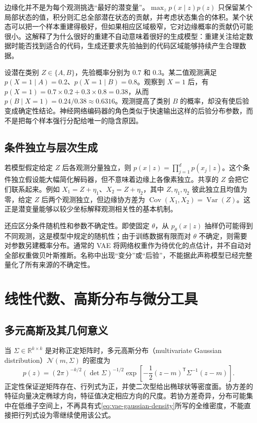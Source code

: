 \documentclass[UTF8,12pt,a4paper,fontset=fandol]{ctexart}
\begin{document}
边缘化并不是为每个观测挑选“最好的潜变量”。$\max_z p(x\mid z)p(z)$ 只保留某个局部状态的值，积分则汇总全部潜在状态的贡献，并考虑状态集合的体积。某个状态可以把一个样本重建得极好，但如果相应区域极窄，它对边缘概率的贡献仍可能很小。这解释了为什么很好的重建不自动意味着很好的生成模型：重建关注给定数据时能否找到适合的代码，生成还要求先验抽到的代码区域能够持续产生合理数据。

\begin{example}[离散后验的手算]
设潜在类别 $Z\in\{A,B\}$，先验概率分别为 $0.7$ 和 $0.3$。某二值观测满足 $p(X=1\mid A)=0.2$、$p(X=1\mid B)=0.8$。观察到 $X=1$ 后，有 $p(X=1)=0.7\times0.2+0.3\times0.8=0.38$，从而 $p(B\mid X=1)=0.24/0.38\approx0.6316$。观测提高了类别 $B$ 的概率，却没有使后验变成确定性结论。神经网络编码器的角色类似于快速输出这样的后验分布参数，而不是把每个样本强行分配给唯一的隐含原因。
\end{example}

\subsection{条件独立与层次生成}
若模型假定给定 $Z$ 后各观测分量独立，则 $p(x\mid z)=\prod_{j=1}^{d}p(x_j\mid z)$。这个条件独立假设能大幅简化解码器，但不意味着边缘上各像素独立。共享的 $Z$ 会把它们联系起来。例如 $X_1=Z+\eta_1$、$X_2=Z+\eta_2$，其中 $Z,\eta_1,\eta_2$ 彼此独立且均值为零，给定 $Z$ 后两个观测独立，但边缘协方差为 $\operatorname{Cov}(X_1,X_2)=\operatorname{Var}(Z)$。这正是潜变量能够以较少坐标解释观测相关性的基本机制。

还应区分条件随机性和参数不确定性。即使固定 $\theta$，从 $p_\theta(x\mid z)$ 抽样仍可能得到不同观测，这是模型中规定的随机性；由于训练数据有限而对 $\theta$ 不确定，则需要对参数另建概率分布。通常的 VAE 将网络权重作为待优化的点估计，并不自动对全部权重做贝叶斯推断。名称中出现“变分”或“后验”，不能据此声称模型已经完整量化了所有来源的不确定性。

\section{线性代数、高斯分布与微分工具}
\label{sec:vae-gaussian}

\subsection{多元高斯及其几何意义}
当 $\Sigma\in\mathbb R^{k\times k}$ 是对称正定矩阵时，多元高斯分布（multivariate Gaussian distribution）$\mathcal N(m,\Sigma)$ 的密度为
\begin{equation}
 p(z)=(2\pi)^{-k/2}(\det\Sigma)^{-1/2}
 \exp\!\left[-\frac12(z-m)^\mathsf T\Sigma^{-1}(z-m)\right].
 \label{eq:vae-gaussian-density}
\end{equation}
正定性保证逆矩阵存在、行列式为正，并使二次型给出椭球状等密度面。协方差的特征向量决定椭球方向，特征值决定相应方向的尺度。若协方差奇异，分布可能集中在低维子空间上，不再具有式\eqref{eq:vae-gaussian-density}所写的全维密度，不能直接把行列式设为零继续使用该公式。
\end{document}
